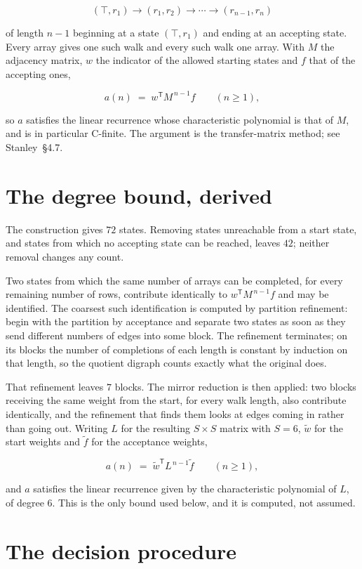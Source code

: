 \documentclass[11pt]{article}
\theoremstyle{definition}
\begin{document}
\[(\top,r_1) \to (r_1,r_2) \to \cdots \to (r_{n-1},r_n)\]

of length $n-1$ beginning at a state $(\top,r_1)$ and ending at an accepting state. Every array gives one such walk and every such walk one array. With $M$ the adjacency matrix, $w$ the indicator of the allowed starting states and $f$ that of the accepting ones,

\[a(n) \;=\; w^{\mathsf T} M^{\,n-1} f \qquad (n \ge 1),\]

so $a$ satisfies the linear recurrence whose characteristic polynomial is that of $M$, and is in particular C-finite. The argument is the transfer-matrix method; see Stanley~\S4.7.

\section{The degree bound, derived}

The construction gives $72$ states. Removing states unreachable from a start state, and states from which no accepting state can be reached, leaves $42$; neither removal changes any count.

Two states from which the same number of arrays can be completed, for every remaining number of rows, contribute identically to $w^{\mathsf T}M^{\,n-1}f$ and may be identified. The coarsest such identification is computed by partition refinement: begin with the partition by acceptance and separate two states as soon as they send different numbers of edges into some block. The refinement terminates; on its blocks the number of completions of each length is constant by induction on that length, so the quotient digraph counts exactly what the original does.

That refinement leaves $7$ blocks. The mirror reduction is then applied: two blocks receiving the same weight from the start, for every walk length, also contribute identically, and the refinement that finds them looks at edges coming in rather than going out. Writing $L$ for the resulting $S \times S$ matrix with $S = 6$, $\tilde w$ for the start weights and $\tilde f$ for the acceptance weights,

\[a(n) \;=\; \tilde w^{\mathsf T} L^{\,n-1} \tilde f \qquad (n \ge 1),\]

and $a$ satisfies the linear recurrence given by the characteristic polynomial of $L$, of degree $6$. This is the only bound used below, and it is computed, not assumed.

\section{The decision procedure}
\end{document}
